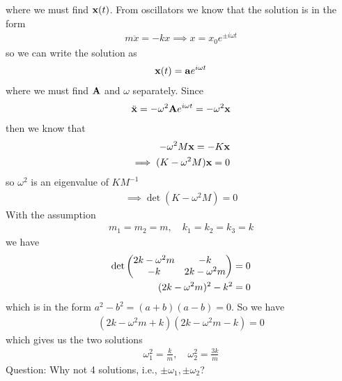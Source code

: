 \documentclass[../main.tex]{subfiles}
\begin{document}
where we must find $\vb x(t)$. From oscillators we know that the solution is in the form
\begin{align*}
    m \ddot x = -kx \implies x = x_0 e^{\pm i\omega t}
\end{align*}
so we can write the solution as
\begin{align*}
    \vb x(t) = \vb a e^{i\omega t}
\end{align*}
where we must find $\vb A$ and $\omega$ separately. Since
\begin{align*}
    \ddot{\vb x} = -\omega^2 \vb A e^{i\omega t} = -\omega^2 \vb x
\end{align*}
then we know that
\begin{align*}
    -\omega^2 M \vb x = - K \vb x \\
    \implies (K - \omega^2 M) \vb x = 0
\end{align*}
so $\omega^2$ is an eigenvalue of $K M^{-1}$
\begin{align*}
    \implies \det(K - \omega^2 M) = 0
\end{align*}
With the assumption 
\begin{align*}
    m_1 = m_2 = m, \quad k_1 = k_2 = k_3 = k
\end{align*}
we have
\begin{align*}
    \det \mqty(2k - \omega^2 m & - k \\ -k & 2k - \omega^2 m) = 0 \\
    (2k - \omega^2 m)^2 - k^2 = 0
\end{align*}
which is in the form $a^2 - b^2 = (a + b)(a - b) = 0$. So we have
\begin{align*}
    (2k - \omega^2 m + k)(2k - \omega^2 m - k) = 0
\end{align*}
which gives us the two solutions 
\begin{align*}
    \omega_1^2 = \frac{k}{m}, \quad \omega_2^2 = \frac{3k}{m}
\end{align*}
Question: Why not 4 solutions, i.e., $\pm \omega_1, \pm \omega_2$? 
\end{document}
